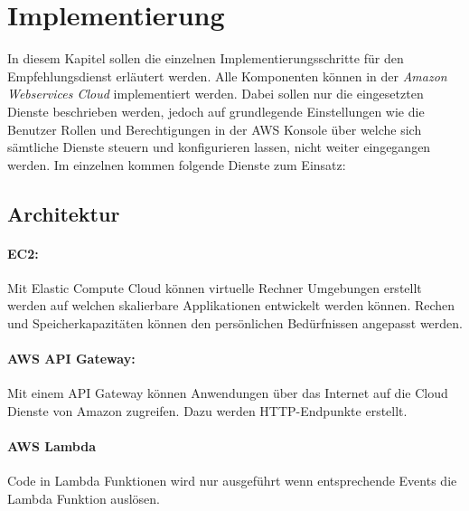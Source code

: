 \section{Implementierung}\label{implementaion}


 In diesem Kapitel sollen die einzelnen Implementierungsschritte für den Empfehlungsdienst erläutert werden. Alle Komponenten können in der \textit{Amazon Webservices Cloud} implementiert werden. Dabei sollen nur die eingesetzten Dienste beschrieben werden, jedoch auf grundlegende Einstellungen wie die Benutzer Rollen und Berechtigungen in der AWS Konsole über welche sich sämtliche Dienste steuern und konfigurieren lassen, nicht weiter eingegangen werden. Im einzelnen kommen folgende Dienste zum Einsatz:

\subsection{Architektur}
\paragraph{EC2:}
\vspace{1em}

Mit Elastic Compute Cloud können virtuelle Rechner Umgebungen erstellt werden auf welchen skalierbare Applikationen entwickelt werden können. Rechen und Speicherkapazitäten können den persönlichen Bedürfnissen angepasst werden. 
\vspace{1em}

\paragraph{AWS API Gateway:}
\vspace{1em}

Mit einem API Gateway können Anwendungen über das Internet auf die Cloud Dienste von Amazon zugreifen. Dazu werden HTTP-Endpunkte erstellt.
\vspace{1em}

\paragraph{AWS Lambda}
\vspace{1em}

Code in Lambda Funktionen wird nur ausgeführt wenn entsprechende Events die Lambda Funktion auslösen.

